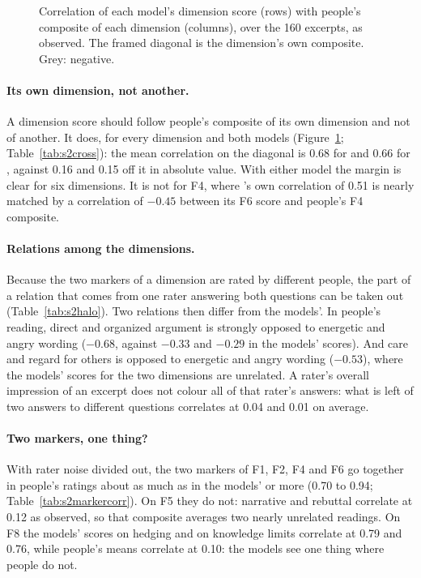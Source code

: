 \begin{figure}[!htb]\centering

\caption{Correlation of each model's dimension score (rows) with people's composite of each dimension
(columns), over the 160 excerpts, as observed. The framed diagonal is the dimension's own composite. Grey:
negative.}\label{fig:s2cross}
\end{figure}

\paragraph{Its own dimension, not another.} A dimension score should follow people's composite of its own
dimension and not of another. It does, for every dimension and both models (Figure~\ref{fig:s2cross};
Table~\ref{tab:s2cross}): the mean correlation on the diagonal is 0.68 for \jev{} and 0.66 for \drex{}, against
0.16 and 0.15 off it in absolute value. With either model the margin is clear for six dimensions. It is not for
F4, where \jev{}'s own correlation of 0.51 is nearly matched by a correlation of $-0.45$ between its F6 score and
people's F4 composite.

\paragraph{Relations among the dimensions.} Because the two markers of a dimension are rated by different
people, the part of a relation that comes from one rater answering both questions can be taken out
(Table~\ref{tab:s2halo}). Two relations then differ from the models'. In people's reading, direct and organized
argument is strongly opposed to energetic and angry wording ($-0.68$, against $-0.33$ and $-0.29$ in the models'
scores). And care and regard for others is opposed to energetic and angry wording ($-0.53$), where the models'
scores for the two dimensions are unrelated. A rater's overall impression of an excerpt does not colour all of
that rater's answers: what is left of two answers to different questions correlates at 0.04 and 0.01 on average.

\paragraph{Two markers, one thing?} With rater noise divided out, the two markers of F1, F2, F4 and F6 go
together in people's ratings about as much as in the models' or more (0.70 to 0.94; Table~\ref{tab:s2markercorr}).
On F5 they do not: narrative and rebuttal correlate at 0.12 as observed, so that composite averages two nearly
unrelated readings. On F8 the models' scores on hedging and on knowledge limits correlate at 0.79 and 0.76,
while people's means correlate at 0.10: the models see one thing where people do not.

